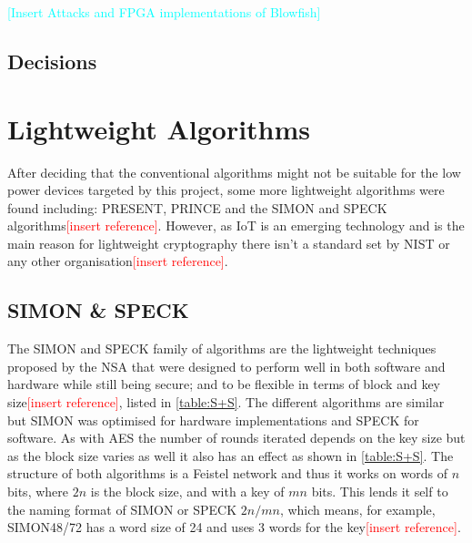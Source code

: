 \documentclass[12pt,twoside,a4paper]{report}
\begin{document}
    \textcolor{cyan}{[Insert Attacks and FPGA implementations of Blowfish]}
    
    \subsection{Decisions}
    
    \section{Lightweight Algorithms}
    After deciding that the conventional algorithms might not be suitable for the low power devices targeted by this project, some more lightweight algorithms were found including: PRESENT, PRINCE and the SIMON and SPECK algorithms\textcolor{red}{[insert reference]}. However, as IoT is an emerging technology and is the main reason for lightweight cryptography there isn't a standard set by NIST or any other organisation\textcolor{red}{[insert reference]}.
    
    \subsection{SIMON \& SPECK}
    The SIMON and SPECK family of algorithms are the lightweight techniques proposed by the NSA that were designed to perform well in both software and hardware while still being secure; and to be flexible in terms of block and key size\textcolor{red}{[insert reference]}, listed in \autoref{table:S+S}. The different algorithms are similar but SIMON was optimised for hardware implementations and SPECK for software. As with AES the number of rounds iterated depends on the key size but as the block size varies as well it also has an effect as shown in \autoref{table:S+S}. The structure of both algorithms is a Feistel network and thus it works on words of $n$ bits, where $2n$ is the block size, and with a key of $mn$ bits. This lends it self to the naming format of SIMON or SPECK $2n/mn$, which means, for example, SIMON48/72 has a word size of 24 and uses 3 words for the key\textcolor{red}{[insert reference]}.
    
\end{document}
